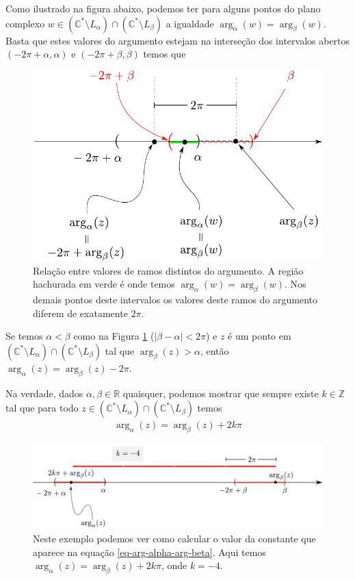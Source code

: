 Como ilustrado na figura abaixo, podemos ter para alguns pontos do plano complexo
$w\in (\mathbb{C}^{*}\setminus L_{\alpha})\cap(\mathbb{C}^{*}\setminus L_{\beta})$
a igualdade $\arg_{\alpha}(w) = \arg_{\beta}(w)$.
Basta que estes valores do argumento estejam na interseção dos intervalos abertos 
$(-2\pi+\alpha,\alpha)$ e $(-2\pi+\beta,\beta)$ temos que 
\begin{figure}[h]
\centering
\includegraphics[width=0.60\linewidth]{"Figuras/ramos-argumento1"}
\caption{Relação entre valores de ramos distintos do argumento. A região hachurada em
verde é onde temos $\arg_{\alpha}(w)=\arg_{\beta}(w)$. Nos demais pontos deste intervalos
os valores deste ramos do argumento diferem de exatamente $2\pi$.}
\label{fig:ramos-argumento1}
\end{figure}

Se temos $\alpha<\beta$ como na Figura \ref{fig:ramos-argumento1} 
($|\beta-\alpha|<2\pi$) e $z$ é um ponto em 
$(\mathbb{C}^{*}\setminus L_{\alpha})\cap(\mathbb{C}^{*}\setminus L_{\beta})$ 
tal que $\arg_{\beta}(z)>\alpha$, então $\arg_{\alpha}(z)=\arg_{\beta}(z)-2\pi$.


Na verdade, dados $\alpha,\beta\in\mathbb{R}$ quaisquer, podemos mostrar que sempre existe $k\in\mathbb{Z}$ tal que para todo 
$z\in (\mathbb{C}^{*}\setminus L_{\alpha})\cap(\mathbb{C}^{*}\setminus L_{\beta})$  
temos 
\begin{align}\label{eq-arg-alpha-arg-beta}
\arg_{\alpha}(z)=\arg_{\beta}(z)+2k\pi
\end{align}

\begin{figure}[h]
\centering
\includegraphics[width=1\linewidth]{"Figuras/ramos-argumento2"}
\caption{Neste exemplo podemos ver como calcular o valor da constante que aparece na equação 
\ref{eq-arg-alpha-arg-beta}. Aqui temos $\arg_{\alpha}(z)=\arg_{\beta}(z)+2k\pi$, onde $k=-4$.}
\label{fig:ramos-argumento2}
\end{figure}

